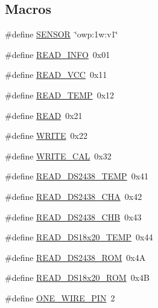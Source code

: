 \subsection*{Macros}
\begin{DoxyCompactItemize}
\item 
\#define \hyperlink{OWP__DG__1w-adaptor_8ino_a84f1ead330bbcc83a63929c4726080d7}{S\-E\-N\-S\-O\-R}~\char`\"{}owp\-:1w\-:v1\char`\"{}
\item 
\#define \hyperlink{OWP__DG__1w-adaptor_8ino_ae9d85efda88bdfdba5ca9fe92f557dd9}{R\-E\-A\-D\-\_\-\-I\-N\-F\-O}~0x01
\item 
\#define \hyperlink{OWP__DG__1w-adaptor_8ino_a3563b296d5f60635a1256e8a12261d74}{R\-E\-A\-D\-\_\-\-V\-C\-C}~0x11
\item 
\#define \hyperlink{OWP__DG__1w-adaptor_8ino_ac8c23082885adeec4834469b64e00bb9}{R\-E\-A\-D\-\_\-\-T\-E\-M\-P}~0x12
\item 
\#define \hyperlink{OWP__DG__1w-adaptor_8ino_ada74e7db007a68e763f20c17f2985356}{R\-E\-A\-D}~0x21
\item 
\#define \hyperlink{OWP__DG__1w-adaptor_8ino_aa10f470e996d0f51210d24f442d25e1e}{W\-R\-I\-T\-E}~0x22
\item 
\#define \hyperlink{OWP__DG__1w-adaptor_8ino_a9418b096dba157494f523dc01b82a760}{W\-R\-I\-T\-E\-\_\-\-C\-A\-L}~0x32
\item 
\#define \hyperlink{OWP__DG__1w-adaptor_8ino_a7dda9dd96643c5e273bce5f237f6c3c9}{R\-E\-A\-D\-\_\-\-D\-S2438\-\_\-\-T\-E\-M\-P}~0x41
\item 
\#define \hyperlink{OWP__DG__1w-adaptor_8ino_a63f32f386170e4065b5fdd7a1a8521cf}{R\-E\-A\-D\-\_\-\-D\-S2438\-\_\-\-C\-H\-A}~0x42
\item 
\#define \hyperlink{OWP__DG__1w-adaptor_8ino_a0cc83db22607312d835fd8da13968847}{R\-E\-A\-D\-\_\-\-D\-S2438\-\_\-\-C\-H\-B}~0x43
\item 
\#define \hyperlink{OWP__DG__1w-adaptor_8ino_a4e819c3b3fde201781ca4a9a1797c188}{R\-E\-A\-D\-\_\-\-D\-S18x20\-\_\-\-T\-E\-M\-P}~0x44
\item 
\#define \hyperlink{OWP__DG__1w-adaptor_8ino_a755ae07d8f76c19ddc3d8b1cc3a753c2}{R\-E\-A\-D\-\_\-\-D\-S2438\-\_\-\-R\-O\-M}~0x4\-A
\item 
\#define \hyperlink{OWP__DG__1w-adaptor_8ino_a7ca8c60e0479524189c52f6179a18244}{R\-E\-A\-D\-\_\-\-D\-S18x20\-\_\-\-R\-O\-M}~0x4\-B
\item 
\#define \hyperlink{OWP__DG__1w-adaptor_8ino_a394c6366a35129c8aece2e331c3263d5}{O\-N\-E\-\_\-\-W\-I\-R\-E\-\_\-\-P\-I\-N}~2
\end{DoxyCompactItemize}
